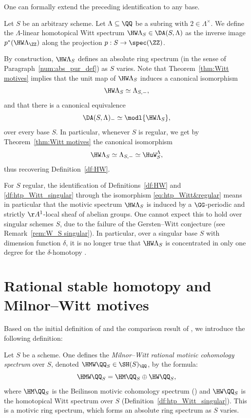 One can formally extend the preceding identification to any base.

\begin{df}\label{df:htp_Witt_singular}
Let $S$ be an arbitrary scheme.
Let $\Lambda \subseteq \QQ$ be a subring with $2 \in \Lambda^\times$.
We define the $\Lambda$-linear homotopical Witt spectrum $\HW \Lambda_S \in \DA(S,\Lambda)$ as the inverse image $p^*(\HW \Lambda_\ZZ)$ along the projection $p:S \to \spec(\ZZ)$.
\end{df}

\begin{num}\label{num:homotopical_Witt}
By construction, $\HW \Lambda_S$ defines an absolute ring spectrum (in the sense of Paragraph~\ref{num:abs_pur_def}) as $S$ varies.
Note that Theorem~\ref{thm:Witt motives} implies that the unit map of $\HW \Lambda_S$ induces a canonical isomorphism
\[
\HW \Lambda_S \simeq \Lambda_{S,-},
\]
and that there is a canonical equivalence
\[\DA(S,\Lambda)_- \simeq \modl{\HW \Lambda_S},\]
over every base $S$.
In particular, whenever $S$ is regular, we get by Theorem~\ref{thm:Witt motives} the canonical isomorphism
\begin{equation}\label{eq:htp_Witt&regular}
\HW \Lambda_S \simeq \Lambda_{S,-} \simeq \HuW^\Lambda_S,
\end{equation}
thus recovering Definition~\ref{df:HW}.
\end{num}

\begin{rem}\label{rem:htp_Witt_singular}
For $S$ regular, the identification of Definitions~\ref{df:HW} and \ref{df:htp_Witt_singular} through the isomorphism \eqref{eq:htp_Witt&regular} means in particular that the motivic spectrum $\HW \Lambda_S$ is induced by
a $\GG$-periodic and strictly $\AA^1$-local sheaf of abelian groups.
One cannot expect this to hold over singular schemes $S$, due to the failure of the Gersten--Witt conjecture (see Remark~\ref{rem:W_S singular}). In particular, over a singular base $S$ with dimension function $\delta$, it is no longer true that $\HW \Lambda_S$ is concentrated in only one degree for the $\delta$-homotopy \tstructure.
\end{rem}

\section{Rational stable homotopy and Milnor--Witt motives}
\label{sec:MW}

Based on the initial definition of \cite[Chap.\,3 \& 6]{BCDFO} and the comparison result
of \cite[4.2]{Garkusha}, we introduce the following definition:
\begin{df}\label{df:HMWQ}
Let $S$ be a scheme. One defines the
\emph{Milnor--Witt rational motivic cohomology spectrum} over $S$, denoted $\HMW \QQ_S \in \SH(S)_\QQ$, by the formula:
\[
\HMW \QQ_S=\HM \QQ_S \oplus \HW \QQ_S,
\]
where $\HM \QQ_S$ is the Beilinson motivic cohomology spectrum (\cf \cite[14.1.2]{CD3})
and $\HW \QQ_S$ is the homotopical Witt spectrum over $S$
(Definition~\ref{df:htp_Witt_singular}).
This is a motivic ring spectrum, which forms an absolute ring spectrum as $S$ varies.
\end{df}

